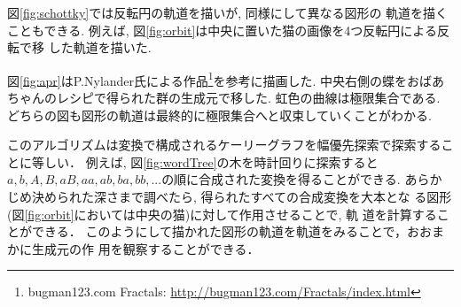図\ref{fig:schottky}では反転円の軌道を描いが, 同様にして異なる図形の
軌道を描くこともできる.
例えば, 図\ref{fig:orbit}は中央に置いた猫の画像を4つ反転円による反転で移
した軌道を描いた.

図\ref{fig:apr}はP.Nylander氏による作品\footnote{bugman123.com Fractals:
\url{http://bugman123.com/Fractals/index.html}}を参考に描画した.
中央右側の蝶をおばあちゃんのレシピで得られた群の生成元で移した.
虹色の曲線は極限集合である.
どちらの図も図形の軌道は最終的に極限集合へと収束していくことがわかる.

このアルゴリズムは変換で構成されるケーリーグラフを幅優先探索で探索するこ
とに等しい．
例えば, 図\ref{fig:wordTree}の木を時計回りに探索すると$a, b, A, B,
aB, aa, ab, ba, bb, ...$の順に合成された変換を得ることができる.
あらかじめ決められた深さまで調べたら, 得られたすべての合成変換を大本とな
る図形(図\ref{fig:orbit}においては中央の猫)に対して作用させることで, 軌
道を計算することができる．
このようにして描かれた図形の軌道を軌道をみることで，おおまかに生成元の作
用を観察することができる．

